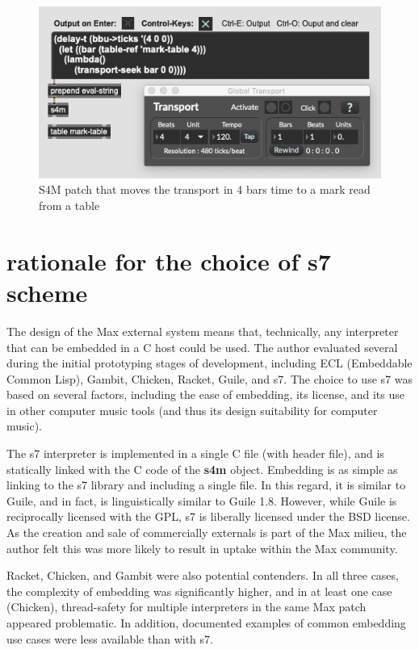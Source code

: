 \documentclass[acmsmall]{acmart}
\begin{document}
\begin{figure}[H]
  \centering
  \includegraphics[width=.75\linewidth]{fig-3-transport}
  \caption{S4M patch that moves the transport in 4 bars time to a mark read from a table}
\end{figure}


\section{rationale for the choice of s7 scheme}

The design of the Max external system means that, technically, any interpreter
that can be embedded in a C host could be used. The author evaluated several during
the initial prototyping stages of development, including ECL (Embeddable Common Lisp),
Gambit, Chicken, Racket, Guile, and s7. The choice to use s7 was based on several 
factors, including the ease of embedding, its license, and its use in other computer music tools (and
thus its design suitability for computer music).

The s7 interpreter is implemented in a single C file (with header file), 
and is statically linked with the C code of the \textbf{s4m} object. Embedding is
as simple as linking to the s7 library and including a single file. In this 
regard, it is similar to Guile, and in fact, is linguistically similar to Guile 1.8.
However, while Guile is reciprocally licensed with the GPL, s7 is liberally licensed 
under the BSD license. As the creation and sale of commercially externals is part of the Max 
milieu, the author felt this was more likely to result in uptake within the Max community.

Racket, Chicken, and Gambit were also potential contenders. In all three cases, the
complexity of embedding was significantly higher, and in at least one case (Chicken),
thread-safety for multiple interpreters in the same Max patch appeared problematic.
In addition, documented examples of common embedding use cases were less available
than with s7.
\end{document}
